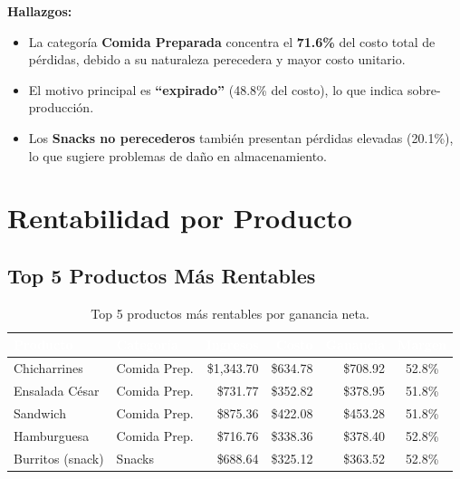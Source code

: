 \documentclass[12pt,letterpaper]{article}
\begin{document}
\textbf{Hallazgos:}
\begin{itemize}[leftmargin=2em]
    \item La categoría \textbf{Comida Preparada} concentra el \textbf{71.6\%} del costo total de pérdidas, debido a su naturaleza perecedera y mayor costo unitario.
    \item El motivo principal es \textbf{``expirado''} (48.8\% del costo), lo que indica sobre-producción.
    \item Los \textbf{Snacks no perecederos} también presentan pérdidas elevadas (20.1\%), lo que sugiere problemas de daño en almacenamiento.
\end{itemize}

\newpage
\section{Rentabilidad por Producto}

\subsection{Top 5 Productos Más Rentables}

\begin{table}[H]
\centering
\footnotesize
{}
\begin{tabular}{l l r r r c}
\toprule
\rowcolor{tabheader}
\textcolor{white}{\textbf{Producto}} &
\textcolor{white}{\textbf{Categoría}} &
\textcolor{white}{\textbf{Ingresos}} &
\textcolor{white}{\textbf{Costo}} &
\textcolor{white}{\textbf{Ganancia}} &
\textcolor{white}{\textbf{Margen}} \\
\midrule
Chicharrines       & Comida Prep. & \$1,343.70 & \$634.78 & \$708.92 & 52.8\% \\
Ensalada César     & Comida Prep. & \$731.77   & \$352.82 & \$378.95 & 51.8\% \\
Sandwich           & Comida Prep. & \$875.36   & \$422.08 & \$453.28 & 51.8\% \\
Hamburguesa        & Comida Prep. & \$716.76   & \$338.36 & \$378.40 & 52.8\% \\
Burritos (snack)   & Snacks       & \$688.64   & \$325.12 & \$363.52 & 52.8\% \\
\bottomrule
\end{tabular}
\caption{Top 5 productos más rentables por ganancia neta.}
\end{table}
\end{document}
